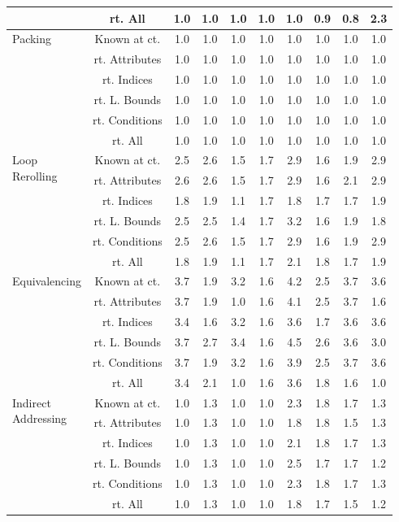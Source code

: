 \documentclass{article}
\begin{document}
\begin{longtable}{|p{2cm}|c|c|c|c|c|c|c|c|c|}
 & rt. All & 1.0 & 1.0 & 1.0 & 1.0 & 1.0 & 0.9 & 0.8 & 2.3\\ \cline{2-10}
\hline
\multirow{6}{*}{ \parbox{2cm}{Packing}} & Known at ct. & 1.0 & 1.0 & 1.0 & 1.0 & 1.0 & 1.0 & 1.0 & 1.0\\ \cline{2-10}
 & rt. Attributes & 1.0 & 1.0 & 1.0 & 1.0 & 1.0 & 1.0 & 1.0 & 1.0\\ \cline{2-10}
 & rt. Indices & 1.0 & 1.0 & 1.0 & 1.0 & 1.0 & 1.0 & 1.0 & 1.0\\ \cline{2-10}
 & rt. L. Bounds & 1.0 & 1.0 & 1.0 & 1.0 & 1.0 & 1.0 & 1.0 & 1.0\\ \cline{2-10}
 & rt. Conditions & 1.0 & 1.0 & 1.0 & 1.0 & 1.0 & 1.0 & 1.0 & 1.0\\ \cline{2-10}
 & rt. All & 1.0 & 1.0 & 1.0 & 1.0 & 1.0 & 1.0 & 1.0 & 1.0\\ \cline{2-10}
\hline
\multirow{6}{*}{ \parbox{2cm}{Loop\\Rerolling}} & Known at ct. & 2.5 & 2.6 & 1.5 & 1.7 & 2.9 & 1.6 & 1.9 & 2.9\\ \cline{2-10}
 & rt. Attributes & 2.6 & 2.6 & 1.5 & 1.7 & 2.9 & 1.6 & 2.1 & 2.9\\ \cline{2-10}
 & rt. Indices & 1.8 & 1.9 & 1.1 & 1.7 & 1.8 & 1.7 & 1.7 & 1.9\\ \cline{2-10}
 & rt. L. Bounds & 2.5 & 2.5 & 1.4 & 1.7 & 3.2 & 1.6 & 1.9 & 1.8\\ \cline{2-10}
 & rt. Conditions & 2.5 & 2.6 & 1.5 & 1.7 & 2.9 & 1.6 & 1.9 & 2.9\\ \cline{2-10}
 & rt. All & 1.8 & 1.9 & 1.1 & 1.7 & 2.1 & 1.8 & 1.7 & 1.9\\ \cline{2-10}
\hline
\multirow{6}{*}{ \parbox{2cm}{Equivalencing}} & Known at ct. & 3.7 & 1.9 & 3.2 & 1.6 & 4.2 & 2.5 & 3.7 & 3.6\\ \cline{2-10}
 & rt. Attributes & 3.7 & 1.9 & 1.0 & 1.6 & 4.1 & 2.5 & 3.7 & 1.6\\ \cline{2-10}
 & rt. Indices & 3.4 & 1.6 & 3.2 & 1.6 & 3.6 & 1.7 & 3.6 & 3.6\\ \cline{2-10}
 & rt. L. Bounds & 3.7 & 2.7 & 3.4 & 1.6 & 4.5 & 2.6 & 3.6 & 3.0\\ \cline{2-10}
 & rt. Conditions & 3.7 & 1.9 & 3.2 & 1.6 & 3.9 & 2.5 & 3.7 & 3.6\\ \cline{2-10}
 & rt. All & 3.4 & 2.1 & 1.0 & 1.6 & 3.6 & 1.8 & 1.6 & 1.0\\ \cline{2-10}
\hline
\multirow{6}{*}{ \parbox{2cm}{Indirect\\Addressing}} & Known at ct. & 1.0 & 1.3 & 1.0 & 1.0 & 2.3 & 1.8 & 1.7 & 1.3\\ \cline{2-10}
 & rt. Attributes & 1.0 & 1.3 & 1.0 & 1.0 & 1.8 & 1.8 & 1.5 & 1.3\\ \cline{2-10}
 & rt. Indices & 1.0 & 1.3 & 1.0 & 1.0 & 2.1 & 1.8 & 1.7 & 1.3\\ \cline{2-10}
 & rt. L. Bounds & 1.0 & 1.3 & 1.0 & 1.0 & 2.5 & 1.7 & 1.7 & 1.2\\ \cline{2-10}
 & rt. Conditions & 1.0 & 1.3 & 1.0 & 1.0 & 2.3 & 1.8 & 1.7 & 1.3\\ \cline{2-10}
 & rt. All & 1.0 & 1.3 & 1.0 & 1.0 & 1.8 & 1.7 & 1.5 & 1.2\\ \cline{2-10}
\hline
\end{longtable}
\end{document}
